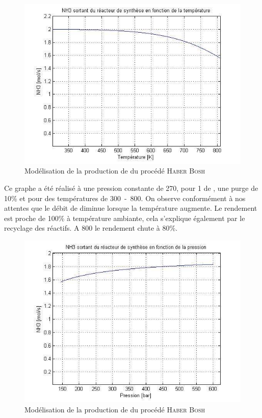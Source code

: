 \begin{figure}
	\centering
	\includegraphics[scale=0.5]{media/purgeTemperature.jpg} 
	\caption{Modélisation de la production de  du procédé \textsc{Haber Bosh}}
	\label{fig:purgeTemperature}
\end{figure}

Ce graphe \cite{fig:purgeTemperature} a été réalisé à une pression constante de \unit{270}{\bbar}, pour \unit{1}{\mole\per\second} de , une purge de 10\% et pour des températures de \unit{300-800}{\kelvin}. On observe conformément à nos attentes que le débit de  diminue lorsque la température augmente. Le rendement est proche de 100\% à température ambiante, cela s'explique également par le recyclage des réactifs. A \unit{800}{\kelvin} le rendement chute à 80\%.

\begin{figure}
	\centering
	\includegraphics[scale=0.5]{media/purgePression.jpg} 
	\caption{Modélisation de la production de  du procédé \textsc{Haber Bosh}}
	\label{fig:purgePression}
\end{figure}

